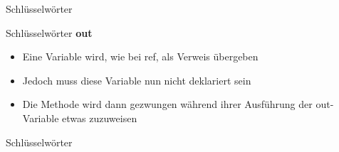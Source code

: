 \begin{frame}{Schlüsselwörter}
	
	
\end{frame}

\begin{frame}{Schlüsselwörter}
	\textbf{out}\\
	\begin{itemize}
		\item Eine Variable wird, wie bei \alert{ref}, als Verweis übergeben
		\item Jedoch muss diese Variable nun nicht deklariert sein
		\item Die Methode wird dann gezwungen während ihrer Ausführung der \alert{out}-Variable etwas zuzuweisen
	\end{itemize}
\end{frame}

\begin{frame}{Schlüsselwörter}
	
	
\end{frame}



